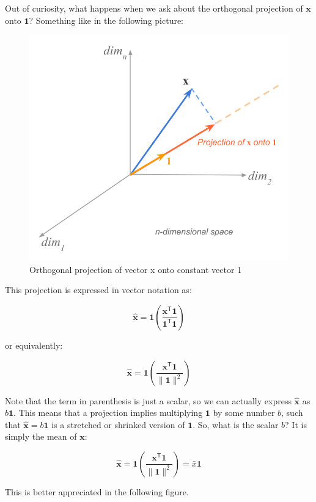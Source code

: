 \documentclass[]{book}
\begin{document}
Out of curiosity, what happens when we ask about the orthogonal projection of
\(\mathbf{x}\) onto \(\mathbf{1}\)? Something like in the following picture:

\begin{figure}

{\centering \includegraphics[width=0.6\linewidth]{images/duality/mean-projection1} 

}

\caption{Orthogonal projection of vector x onto constant vector 1}\label{fig:unnamed-chunk-21}
\end{figure}

This projection is expressed in vector notation as:

\[
\mathbf{\hat{x}} = \mathbf{1} \left( \frac{\mathbf{x^\mathsf{T} 1}}{\mathbf{1^\mathsf{T} 1}} \right)
\]

or equivalently:

\[
\mathbf{\hat{x}} = \mathbf{1} \left( \frac{\mathbf{x^\mathsf{T} 1}}{\| \mathbf{1} \|^2} \right)
\]

Note that the term in parenthesis is just a scalar, so we can actually express
\(\mathbf{\hat{x}}\) as \(b \mathbf{1}\). This means that a projection implies
multiplying \(\mathbf{1}\) by some number \(b\), such that
\(\mathbf{\hat{x}} = b \mathbf{1}\) is a stretched or shrinked version of
\(\mathbf{1}\). So, what is the scalar \(b\)? It is simply the mean of \(\mathbf{x}\):

\[
\mathbf{\hat{x}} = \mathbf{1} \left( \frac{\mathbf{x^\mathsf{T} 1}}{\| \mathbf{1} \|^2} \right) = \bar{x} \mathbf{1}
\]

This is better appreciated in the following figure.
\end{document}
